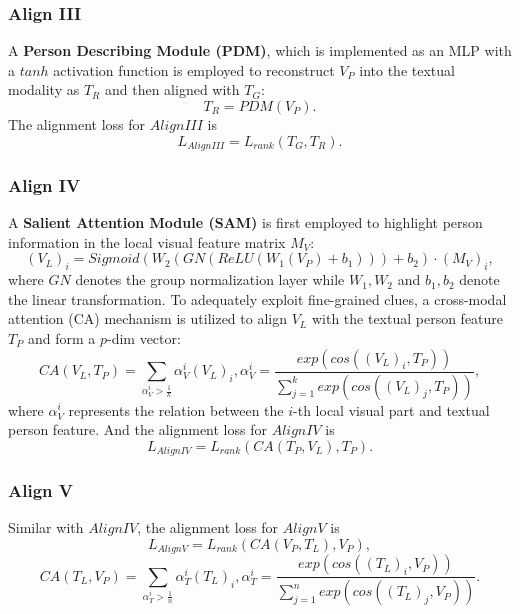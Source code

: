 \documentclass[sigconf]{acmart}
\begin{document}
\subsubsection{Align III}
A \textbf{Person Describing Module (PDM)}, which is implemented as an MLP with a $tanh$ activation function is employed to reconstruct $V_{P}$ into the textual modality as $T_{R}$ and then aligned with $T_{G}$:
\begin{equation}
	T_{R} = PDM(V_{P}).
\end{equation}
The alignment loss for $AlignIII$ is
\begin{equation}
	L_{AlignIII} = L_{rank}(T_{G}, T_{R}).
\end{equation}

\subsubsection{Align IV}
A \textbf{Salient Attention Module (SAM)} is first employed to highlight person information in the local visual feature matrix $M_{V}$:
\begin{equation}
	(V_{L})_{i} = Sigmoid(W_{2}(GN(ReLU(W_{1}(V_{P}) + b_{1}))) + b_{2}) \cdot (M_{V})_{i},
\end{equation}
where $GN$ denotes the group normalization layer while $W_{1}, W_{2}$ and $b_{1} , b_{2}$ denote the linear transformation. To adequately exploit fine-grained clues, a cross-modal attention (CA) mechanism \cite{niu2020improving, wang2020img} is utilized to align $V_{L}$ with the textual person feature $T_{P}$ and form a $p$-dim vector:
\begin{equation}
	CA(V_{L}, T_{P}) = \sum\limits_{\alpha^{i}_{V} > \frac{1}{k}} \alpha^{i}_{V} (V_{L})_{i},
\alpha^{i}_{V} = \frac{exp(cos((V_{L})_{i}, T_{P}))}{\sum_{j=1}^{k} exp(cos((V_{L})_{j}, T_{P}))},
\end{equation}
where $\alpha^{i}_{V}$ represents the relation between the $i$-th local visual part and textual person feature. And the alignment loss for $Align IV$ is
\begin{equation}
	L_{AlignIV} = L_{rank}(CA(T_{P}, V_{L}), T_{P}).
\end{equation}

\subsubsection{Align V}
Similar with $Align IV$, the alignment loss for $Align V$ is
\begin{equation}
	L_{AlignV} = L_{rank}(CA(V_{P}, T_{L}), V_{P}),
\end{equation}
\begin{equation}
	CA(T_{L}, V_{P}) = \sum\limits_{\alpha^{i}_{T} > \frac{1}{n}} \alpha^{i}_{T} (T_{L})_{i},
\alpha^{i}_{T} = \frac{exp(cos((T_{L})_{i}, V_{P}))}{\sum_{j=1}^{n} exp(cos((T_{L})_{j}, V_{P}))}.
\end{equation}
\end{document}

